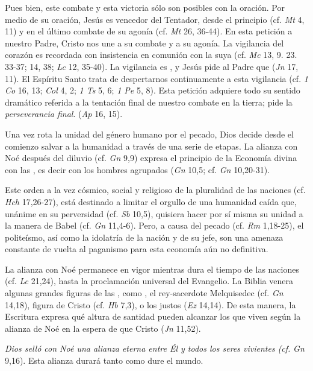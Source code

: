 \begin{ccebody}
 Pues bien, este combate y esta victoria sólo son posibles con la oración. Por medio de su oración, Jesús es vencedor del Tentador, desde el principio (cf. \textit{Mt} 4, 11) y en el último combate de su agonía (cf. \textit{Mt} 26, 36-44). En esta petición a nuestro Padre, Cristo nos une a su combate y a su agonía. La vigilancia del corazón es recordada con insistencia en comunión con la suya (cf. \textit{Mc} 13, 9. 23. 33-37; 14, 38; \textit{Lc} 12, 35-40). La vigilancia es , y Jesús pide al Padre que  (\textit{Jn} 17, 11). El Espíritu Santo trata de despertarnos continuamente a esta vigilancia (cf. \textit{1 Co} 16, 13; \textit{Col} 4, 2; \textit{1 Ts} 5, 6; \textit{1 Pe} 5, 8). Esta petición adquiere todo su sentido dramático referida a la tentación final de nuestro combate en la tierra; pide la \textit{perseverancia final}.  (\textit{Ap} 16, 15).
\end{ccebody}

\newpage


\begin{ccebody}
 Una vez rota la unidad del género humano por el pecado, Dios decide desde el comienzo salvar a la humanidad a través de una serie de etapas. La alianza con Noé después del diluvio (cf. \textit{Gn} 9,9) expresa el principio de la Economía divina con las , es decir con los hombres agrupados  (\textit{Gn} 10,5; cf. \textit{Gn} 10,20-31).

 Este orden a la vez cósmico, social y religioso de la pluralidad de las naciones (cf. \textit{Hch} 17,26-27), está destinado a limitar el orgullo de una humanidad caída que, unánime en su perversidad (cf. \textit{Sb} 10,5), quisiera hacer por sí misma su unidad a la manera de Babel (cf. \textit{Gn} 11,4-6). Pero, a causa del pecado (cf. \textit{Rm} 1,18-25), el politeísmo, así como la idolatría de la nación y de su jefe, son una amenaza constante de vuelta al paganismo para esta economía aún no definitiva.

 La alianza con Noé permanece en vigor mientras dura el tiempo de las naciones (cf. \textit{Lc} 21,24), hasta la proclamación universal del Evangelio. La Biblia venera algunas grandes figuras de las , como , el rey-sacerdote Melquisedec (cf. \textit{Gn} 14,18), figura de Cristo (cf. \textit{Hb} 7,3), o los justos  (\textit{Ez} 14,14). De esta manera, la Escritura expresa qué altura de santidad pueden alcanzar los que viven según la alianza de Noé en la espera de que Cristo  (\textit{Jn} 11,52).

 \textit{Dios selló con Noé una alianza eterna entre Él y todos los seres vivientes (cf.} \textit{Gn} 9,16). Esta alianza durará tanto como dure el mundo.
\end{ccebody}

